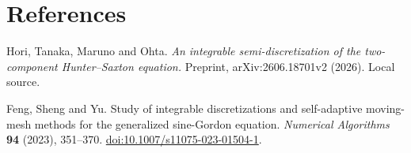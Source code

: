 \documentclass[11pt,a4paper]{article}
\begin{document}
\FloatBarrier
\section*{References}
 
\begin{enumerate}[label={[\arabic*]},leftmargin=*,itemsep=5pt]

\item Hori, Tanaka, Maruno and Ohta. \textit{An integrable semi-discretization of the two-component Hunter–Saxton equation.} Preprint, arXiv:2606.18701v2 (2026). Local source.
 
\item Feng, Sheng and Yu. Study of integrable discretizations and self-adaptive moving-mesh methods for the generalized sine-Gordon equation. \textit{Numerical Algorithms} \textbf{94} (2023), 351–370. \href{https://doi.org/10.1007/s11075-023-01504-1}{doi:10.1007/s11075-023-01504-1}.

\end{enumerate}
 
\end{document}

